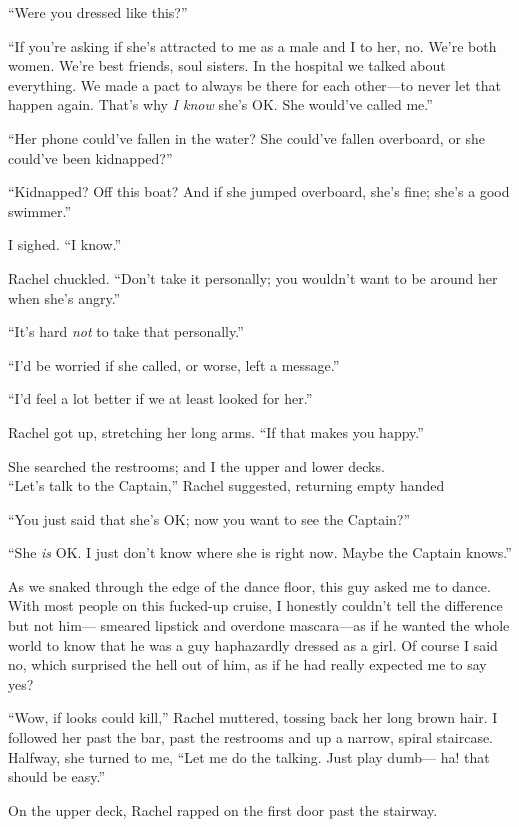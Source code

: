 ``Were you dressed like this?''

``If you're asking if she's attracted to me as a male and I to her, no.
We're both women. We're best friends, soul sisters. In the hospital we
talked about everything. We made a pact to always be there for each
other---to never let that happen again. That's why \emph{I know} she's
OK. She would've called me.''

``Her phone could've fallen in the water? She could've fallen overboard,
or she could've been kidnapped?''

``Kidnapped? Off this boat? And if she jumped overboard, she's fine;
she's a good swimmer.''

I sighed. ``I know.''

Rachel chuckled. ``Don't take it personally; you wouldn't want to be
around her when she's angry.''

``It's hard \emph{not} to take that personally.''

``I'd be worried if she called, or worse, left a message.''

``I'd feel a lot better if we at least looked for her.''

Rachel got up, stretching her long arms. ``If that makes you happy.''

She searched the restrooms; and I the upper and lower decks.\\

``Let's talk to the Captain,'' Rachel suggested, returning empty handed

``You just said that she's OK; now you want to see the Captain?''

``She \emph{is} OK. I just don't know where she is right now. Maybe the
Captain knows.''

As we snaked through the edge of the dance floor, this guy asked me to
dance. With most people on this fucked-up cruise, I honestly couldn't
tell the difference but not him--- smeared lipstick and overdone
mascara---as if he wanted the whole world to know that he was a guy
haphazardly dressed as a girl. Of course I said no, which surprised the
hell out of him, as if he had really expected me to say yes?

``Wow, if looks could kill,'' Rachel muttered, tossing back her long
brown hair. I followed her past the bar, past the restrooms and up a
narrow, spiral staircase. Halfway, she turned to me, ``Let me do the
talking. Just play dumb--- ha! that should be easy.''

On the upper deck, Rachel rapped on the first door past the stairway.

